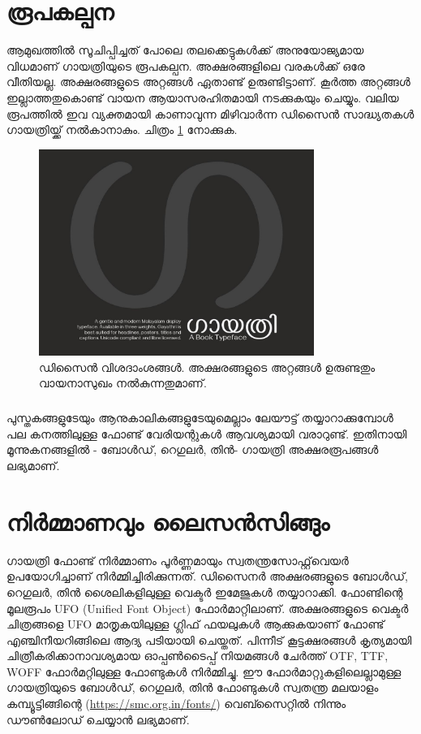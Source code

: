 \documentclass[12pt]{report}
\begin{document}
	
	\chapter*{രൂപകല്പന}
	
	ആമുഖത്തില്‍ സൂചിപ്പിച്ചത് പോലെ തലക്കെട്ടുകള്‍ക്ക് അനുയോജ്യമായ വിധമാണ് ഗായത്രിയുടെ രൂപകല്പന‍. അക്ഷരങ്ങളിലെ വരകൾക്ക് ഒരേ വീതിയല്ല. അക്ഷരങ്ങളുടെ അറ്റങ്ങള്‍ ഏതാണ്ട് ഉരുണ്ടിട്ടാണ്. കൂർത്ത അറ്റങ്ങൾ ഇല്ലാത്തതുകൊണ്ട് വായന ആയാസരഹിതമായി നടക്കുകയും ചെയ്യും.  വലിയ രൂപത്തില്‍ ഇവ വ്യക്തമായി കാണാവുന്ന മിഴിവാര്‍ന്ന ഡിസൈന്‍ സാദ്ധ്യതകള്‍ ഗായത്രിയ്ക്ക് നല്‍കാനാകും.  ചിത്രം \ref{one} നോക്കുക.
	
	\begin{figure}
		\begin{centering}
			\includegraphics[width=0.8\textwidth]{ga.jpg}
			\caption{ഡിസൈന്‍ വിശദാംശങ്ങള്‍. അക്ഷരങ്ങളുടെ അറ്റങ്ങൾ ഉരുണ്ടതും വായനാസുഖം നൽകുന്നതുമാണ്.}
			\label{one}
		\end{centering}
	\end{figure}
	
	\paragraph{}
	പുസ്തകങ്ങളുടേയും ആനുകാലികങ്ങളുടേയുമെല്ലാം ലേയൗട്ട് തയ്യാറാക്കുമ്പോള്‍ പല കനത്തിലുള്ള ഫോണ്ട് വേരിയന്റുകള്‍ ആവശ്യമായി വരാറുണ്ട്. ഇതിനായി മൂന്നുകനങ്ങളില്‍ - ബോള്‍ഡ്, റെഗുലര്‍, തിന്‍- ഗായത്രി അക്ഷരരൂപങ്ങള്‍ ലഭ്യമാണ്. 
	
	\chapter*{നിര്‍മ്മാണവും ലൈസന്‍സിങ്ങും}
	
	ഗായത്രി ഫോണ്ട് നിര്‍മ്മാണം പൂര്‍ണ്ണമായും സ്വതന്ത്രസോഫ്റ്റ്‌വെയർ ഉപയോഗിച്ചാണ് നിർമ്മിച്ചിരിക്കുന്നത്. ഡിസൈനര്‍ അക്ഷരങ്ങളുടെ ബോള്‍ഡ്, റെഗുലര്‍, തിന്‍ ശൈലികളിലുള്ള വെക്ടര്‍ ഇമേജുകള്‍ തയ്യാറാക്കി. ഫോണ്ടിന്റെ മൂലരൂപം UFO (Unified Font Object) ഫോര്‍മാറ്റിലാണ്. അക്ഷരങ്ങളുടെ വെക്ടർ ചിത്രങ്ങളെ UFO മാതൃകയിലുള്ള ഗ്ലിഫ് ഫയലുകള്‍ ആക്കുകയാണ് ഫോണ്ട് എഞ്ചിനീയറിങ്ങിലെ ആദ്യ പടിയായി ചെയ്തത്. പിന്നീട് കൂട്ടക്ഷരങ്ങള്‍ കൃത്യമായി ചിത്രീകരിക്കാനാവശ്യമായ ഓപ്പണ്‍ടൈപ്പ് നിയമങ്ങള്‍ ചേര്‍ത്ത്  OTF, TTF, WOFF ഫോര്‍മറ്റിലുള്ള ഫോണ്ടുകള്‍ നിര്‍മ്മിച്ചു. ഈ ഫോര്‍മാറ്റുകളിലെല്ലാമുള്ള ഗായത്രിയുടെ ബോള്‍ഡ്, റെഗുലര്‍, തിന്‍ ഫോണ്ടുകള്‍ സ്വതന്ത്ര മലയാളം കമ്പ്യൂട്ടിങ്ങിന്റെ (\url{https://smc.org.in/fonts/}) വെബ്സൈറ്റിൽ നിന്നും ഡൗണ്‍ലോഡ് ചെയ്യാന്‍ ലഭ്യമാണ്.
	
\end{document}
